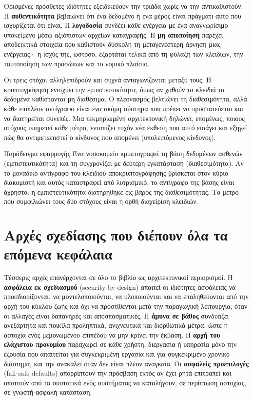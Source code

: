 \documentclass[11pt,openany]{book}
\begin{document}
Ορισμένες πρόσθετες ιδιότητες εξειδικεύουν την τριάδα χωρίς να την αντικαθιστούν. Η \textbf{αυθεντικότητα} βεβαιώνει ότι ένα δεδομένο ή ένα μέρος είναι πράγματι αυτό που ισχυρίζεται ότι είναι. Η \textbf{λογοδοσία} συνδέει κάθε ενέργεια με ένα αναγνωρίσιμο υποκείμενο μέσω αξιόπιστων αρχείων καταγραφής. Η \textbf{μη αποποίηση} παρέχει αποδεικτικά στοιχεία που καθιστούν δύσκολη τη μεταγενέστερη άρνηση μιας ενέργειας· η ισχύς της, ωστόσο, εξαρτάται τελικά από τη φύλαξη των κλειδιών, την ταυτοποίηση των προσώπων και το νομικό πλαίσιο.

Οι τρεις στόχοι αλληλεπιδρούν και συχνά ανταγωνίζονται μεταξύ τους. Η κρυπτογράφηση ενισχύει την εμπιστευτικότητα, όμως αν χαθούν τα κλειδιά τα δεδομένα καθίστανται μη διαθέσιμα. Ο πλεονασμός βελτιώνει τη διαθεσιμότητα, αλλά κάθε επιπλέον αντίγραφο είναι ένα ακόμη σύστημα που πρέπει να προστατεύεται και να διατηρείται συνεπές. Μια τεκμηριωμένη αρχιτεκτονική δηλώνει, επομένως, ποιους στόχους υπηρετεί κάθε μέτρο, εντοπίζει τυχόν νέα έκθεση που αυτό εισάγει και εξηγεί πώς θα αντιμετωπιστεί ο κίνδυνος που απομένει (υπολειπόμενος κίνδυνος).

\begin{examplebox}{Παράδειγμα εφαρμογής}
Ένα νοσοκομείο κρυπτογραφεί τη βάση δεδομένων ασθενών (εμπιστευτικότητα) και τη συγχρονίζει με δεύτερη εγκατάσταση (διαθεσιμότητα). Αν το μοναδικό αντίγραφο του κλειδιού αποκρυπτογράφησης βρίσκεται στον κύριο διακομιστή και αυτός καταστραφεί από λυτρισμικό, το αντίγραφο της βάσης είναι άχρηστο: η εμπιστευτικότητα διατηρήθηκε εις βάρος της διαθεσιμότητας. Το μέτρο που συμφιλιώνει τους δύο στόχους είναι η ορθή διαχείριση κλειδιών.
\end{examplebox}

\section{Αρχές σχεδίασης που διέπουν όλα τα επόμενα κεφάλαια}\label{sec:1.3}
Τέσσερις αρχές επανέρχονται σε όλο το βιβλίο ως αρχιτεκτονικοί περιορισμοί. Η \textbf{ασφάλεια εκ σχεδιασμού} (security by design) απαιτεί οι ιδιότητες ασφάλειας να προσδιορίζονται, να μοντελοποιούνται, να υλοποιούνται και να επαληθεύονται από την αρχή του κύκλου ζωής και όχι να προστίθενται μετά την παραγωγική λειτουργία, όταν οι αλλαγές είναι δαπανηρές και αποσπασματικές. Η \textbf{άμυνα σε βάθος} συνδυάζει ανεξάρτητα και ποικίλα προληπτικά, ανιχνευτικά και διορθωτικά μέτρα, ώστε η αστοχία ενός μεμονωμένου επιπέδου να μην κρίνει την έκβαση. Η \textbf{αρχή του ελάχιστου προνομίου} παραχωρεί σε κάθε χρήστη, διεργασία ή υπηρεσία μόνο την εξουσία που απαιτείται για συγκεκριμένη εργασία και για συγκεκριμένο χρονικό διάστημα, και την ανακαλεί όταν δεν είναι πλέον αναγκαία. Οι \textbf{ασφαλείς προεπιλογές} (fail-safe defaults) απορρίπτουν την πρόσβαση εκτός αν έχει ρητά επιτραπεί και απαιτούν από τα συστατικά ενός συστήματος να καταλήγουν, σε περίπτωση αστοχίας, σε γνωστή ασφαλή κατάσταση.
\end{document}
